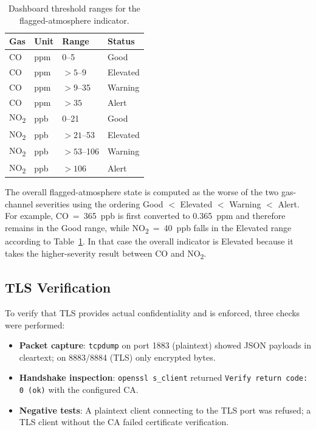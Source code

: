 \documentclass[conference]{IEEEtran}
\begin{document}
\begin{table}[t]
\centering
\caption{Dashboard threshold ranges for the flagged-atmosphere indicator.}
\label{tab:airquality_thresholds}
\scriptsize
\begin{tabular}{@{}lllp{}@{}}
\toprule
Gas & Unit & Range & Status \\
\midrule
CO & ppm & 0--5 & Good \\
CO & ppm & $>5$--9 & Elevated \\
CO & ppm & $>9$--35 & Warning \\
CO & ppm & $>35$ & Alert \\
NO\textsubscript{2} & ppb & 0--21 & Good \\
NO\textsubscript{2} & ppb & $>21$--53 & Elevated \\
NO\textsubscript{2} & ppb & $>53$--106 & Warning \\
NO\textsubscript{2} & ppb & $>106$ & Alert \\
\bottomrule
\end{tabular}
\end{table}

The overall flagged-atmosphere state is computed as the worse of the two gas-channel severities using the ordering Good $<$ Elevated $<$ Warning $<$ Alert. For example, CO~=~365~ppb is first converted to 0.365~ppm and therefore remains in the Good range, while NO\textsubscript{2}~=~40~ppb falls in the Elevated range according to Table~\ref{tab:airquality_thresholds}. In that case the overall indicator is Elevated because it takes the higher-severity result between CO and NO\textsubscript{2}.

\subsection{TLS Verification}
To verify that TLS provides actual confidentiality and is enforced, three checks were performed:
\begin{itemize}
\item \textbf{Packet capture}: \texttt{tcpdump} on port 1883 (plaintext) showed JSON payloads in cleartext; on 8883/8884 (TLS) only encrypted bytes.
\item \textbf{Handshake inspection}: \texttt{openssl s\_client} returned \texttt{Verify return code: 0 (ok)} with the configured CA.
\item \textbf{Negative tests}: A plaintext client connecting to the TLS port was refused; a TLS client without the CA failed certificate verification.
\end{itemize}
\end{document}
